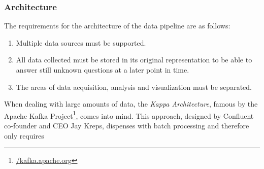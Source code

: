 \subsubsection{Architecture}
\label{subsubsec:architecture}
The requirements for the architecture of the data pipeline are as follows:
\begin{enumerate}
  \item Multiple data sources must be supported.
  \item All data collected must be stored in its original representation to be able to answer still unknown questions at a later point in time.
  \item The areas of data acquisition, analysis and visualization must be separated.
\end{enumerate}

When dealing with large amounts of data, the \textit{Kappa Architecture}, famous by the Apache Kafka Project\footnote{\href{https://kafka.apache.org/}{/kafka.apache.org}}, comes into mind. This approach, designed by Confluent co-founder and CEO Jay Kreps, dispenses with batch processing and therefore only requires

